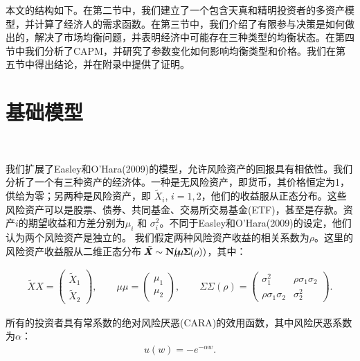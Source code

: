 \documentclass[10.0pt]{article}
\begin{document}
本文的结构如下。在第二节中，我们建立了一个包含天真和精明投资者的多资产模型，并计算了经济人的需求函数。在第三节中，我们介绍了有限参与决策是如何做出的，解决了市场均衡问题，并表明经济中可能存在三种类型的均衡状态。在第四节中我们分析了CAPM，并研究了参数变化如何影响均衡类型和价格。我们在第五节中得出结论，并在附录中提供了证明。

\section{基础模型}

\quad \ 



我们扩展了Easley和O'Hara(2009)的模型，允许风险资产的回报具有相依性。我们分析了一个有三种资产的经济体。一种是无风险资产，即货币，其价格恒定为1，供给为零；另两种是风险资产，即 $ \tilde X_i $, $ i = 1, 2 $，他们的收益服从正态分布。这些风险资产可以是股票、债券、共同基金、交易所交易基金(ETF)，甚至是存款。资产$i$的期望收益和方差分别为$ \mu_i $ 和 $ \sigma_i^2 $。不同于Easley和O'Hara(2009)的设定，他们认为两个风险资产是独立的。 我们假定两种风险资产收益的相关系数为$ \rho $。这里的风险资产收益服从二维正态分布  $ \tilde X \!\!\!\!\!\! X \sim {\bf N} (\mu \!\!\!\!\!\! \mu, \Sigma \!\!\!\!\! \Sigma (\rho)) $，其中：

\begin{eqnarray*}
\tilde X \!\!\!\!\!\! X = \left( \begin{matrix} \tilde X_1 \\ \tilde X_2 \end{matrix} \right), \qquad \mu \!\!\!\!\!\! \mu = \left( \begin{matrix} \mu_1 \\ \mu_2 \end{matrix} \right), \qquad \Sigma \!\!\!\!\! \Sigma (\rho) = \left( \begin{matrix} \sigma_1^2 & \rho \sigma_1 \sigma_2 \\ \rho \sigma_1 \sigma_2 & \sigma_2^2 \end{matrix} \right).
\end{eqnarray*}


所有的投资者具有常系数的绝对风险厌恶(CARA)的效用函数，其中风险厌恶系数为$\alpha $：
\begin{eqnarray}
u (w) = - e^{- \alpha w}.
\end{eqnarray}
\end{document}
